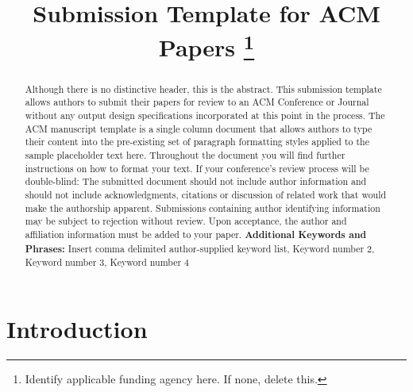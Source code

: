 \documentclass[conference]{IEEEtran}
\begin{document}
\title{Submission Template for ACM Papers
\thanks{Identify applicable funding agency here. If none, delete this.}}

\author{

\and
{}

\and
{}

\and
{}

}

\maketitle

\begin{abstract}
Although there is no distinctive header, this is the abstract. This submission template allows authors to submit their papers for review to an ACM Conference or Journal without any output design specifications incorporated at this point in the process. The ACM manuscript template is a single column document that allows authors to type their content into the pre-existing set of paragraph formatting styles applied to the sample placeholder text here. Throughout the document you will find further instructions on how to format your text. If your conference’s review process will be double-blind: The submitted document should not include author information and should not include acknowledgments, citations or discussion of related work that would make the authorship apparent. Submissions containing author identifying information may be subject to rejection without review. Upon acceptance, the author and affiliation information must be added to your paper.
\textbf{Additional Keywords and Phrases: }Insert comma delimited author-supplied keyword list, Keyword number 2, Keyword number 3, Keyword number 4
\end{abstract}

\section{Introduction}
\end{document}
